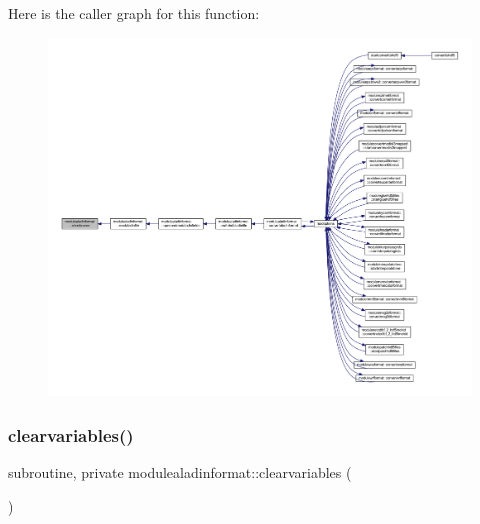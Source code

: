 Here is the caller graph for this function\+:\nopagebreak
\begin{figure}[H]
\begin{center}
\leavevmode
\includegraphics[width=350pt]{namespacemodulealadinformat_ad07bce7e401d49446a1fcfabb4bb4fa8_icgraph}
\end{center}
\end{figure}
\mbox{\label{namespacemodulealadinformat_abe2227188275639d4c746fc709d090e2}} 
\subsubsection{\texorpdfstring{clearvariables()}{clearvariables()}}
{\footnotesize\ttfamily subroutine, private modulealadinformat\+::clearvariables (\begin{DoxyParamCaption}{ }\end{DoxyParamCaption})\hspace{0.3cm}{\ttfamily [private]}}

